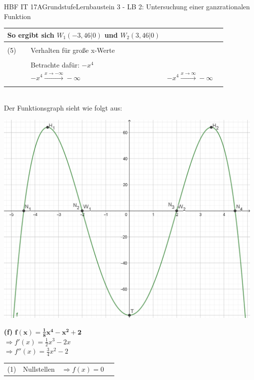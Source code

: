 \documentclass[oneside,openany,headings=optiontotoc,11pt,numbers=noenddot]{scrreprt}
\begin{document}
\begin{worksheet}{HBF IT 17A}{Grundstufe}{Lernbaustein 3 - LB 2: Untersuchung einer ganzrationalen Funktion}
\begin{framed}
\begin{tabularx}{\textwidth}{lXXl}
				\multicolumn{2}{l}{So ergibt sich \colorbox{blue!5}{\(W_1(-3,46|0)\)} und \colorbox{blue!5}{\(W_2(3,46|0)\)}}\\
				\hline\hline\\
				(5) & Verhalten für große x-Werte\\
				\hline\\
				& Betrachte dafür: \(-x^4\)\\
				& \colorbox{green!10}{\(-x^4\xrightarrow{x\rightarrow-\infty}-\infty\)} & \colorbox{green!10}{\(-x^4\xrightarrow{x\rightarrow\infty}-\infty\)}\\
				\hline\hline\\
			\end{tabularx}\\
			Der Funktionsgraph sieht wie folgt aus:\\
			\par
			\includegraphics[scale=0.35]{Bilder/HAe.png}\\
		\end{framed}
		\newpage
		\begin{framed}
			\noindent
			\textbf{(f)} \(\mathbf{f(x) = \frac{1}{8}x^4 -x^2+2}\)\\
			\(\Rightarrow f'(x) = \frac{1}{2}x^3-2x\)\\
			\(\Rightarrow f''(x) = \frac{3}{4}x^2 -2\)\\
			\par\noindent
			\begin{tabularx}{\textwidth}{lXXl}
				(1) & Nullstellen & \(\Rightarrow f(x) = 0\)\\

\end{tabularx}
\end{framed}
\end{worksheet}
\end{document}
